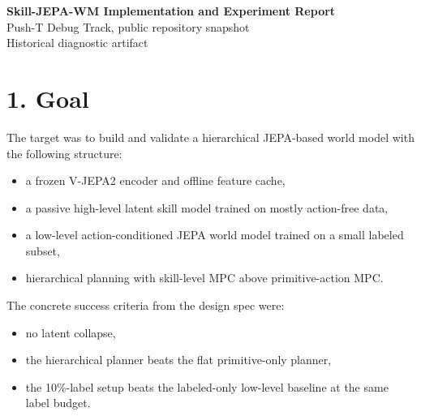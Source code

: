 \documentclass[11pt]{article}
\begin{document}
\begin{center}
{\LARGE\bfseries \textcolor{ReportBlue}{Skill-JEPA-WM Implementation and Experiment Report}}\\[0.5em]
{\large Push-T Debug Track, public repository snapshot}\\[0.4em]
{\normalsize Historical diagnostic artifact}
\end{center}

\vspace{0.75em}

\noindent
{}

\section*{1. Goal}

The target was to build and validate a hierarchical JEPA-based world model with the following structure:

\begin{itemize}
\item a frozen V-JEPA2 encoder and offline feature cache,
\item a passive high-level latent skill model trained on mostly action-free data,
\item a low-level action-conditioned JEPA world model trained on a small labeled subset,
\item hierarchical planning with skill-level MPC above primitive-action MPC.
\end{itemize}

The concrete success criteria from the design spec were:

\begin{itemize}
\item no latent collapse,
\item the hierarchical planner beats the flat primitive-only planner,
\item the 10\%-label setup beats the labeled-only low-level baseline at the same label budget.
\end{itemize}
\end{document}
